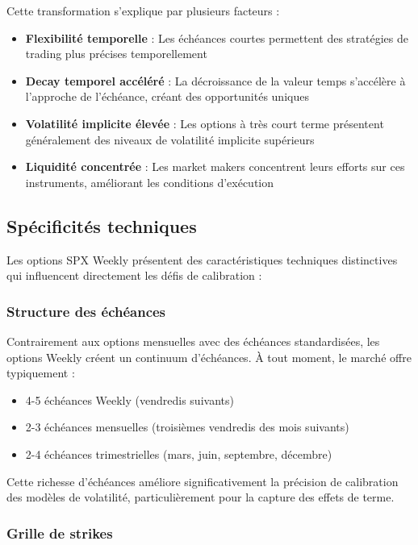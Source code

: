 Cette transformation s'explique par plusieurs facteurs :
\begin{itemize}
\item \textbf{Flexibilité temporelle} : Les échéances courtes permettent des stratégies de trading plus précises temporellement
\item \textbf{Decay temporel accéléré} : La décroissance de la valeur temps s'accélère à l'approche de l'échéance, créant des opportunités uniques
\item \textbf{Volatilité implicite élevée} : Les options à très court terme présentent généralement des niveaux de volatilité implicite supérieurs
\item \textbf{Liquidité concentrée} : Les market makers concentrent leurs efforts sur ces instruments, améliorant les conditions d'exécution
\end{itemize}

\subsection{Spécificités techniques}

Les options SPX Weekly présentent des caractéristiques techniques distinctives qui influencent directement les défis de calibration :

\subsubsection{Structure des échéances}

Contrairement aux options mensuelles avec des échéances standardisées, les options Weekly créent un continuum d'échéances. À tout moment, le marché offre typiquement :
\begin{itemize}
\item 4-5 échéances Weekly (vendredis suivants)
\item 2-3 échéances mensuelles (troisièmes vendredis des mois suivants)
\item 2-4 échéances trimestrielles (mars, juin, septembre, décembre)
\end{itemize}

Cette richesse d'échéances améliore significativement la précision de calibration des modèles de volatilité, particulièrement pour la capture des effets de terme.

\subsubsection{Grille de strikes}

